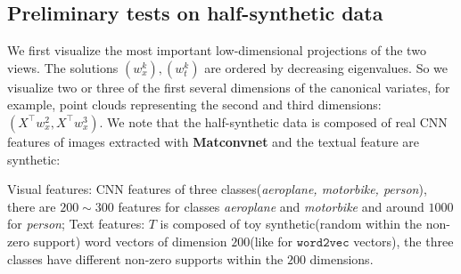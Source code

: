 \documentclass[12pt]{report}	%
\def\ts{\top}
\begin{document}
\subsection{Preliminary tests on half-synthetic data}
We first visualize the most important low-dimensional projections of the two views. The solutions $(w_x^k), (w_t^k)$ are ordered by decreasing eigenvalues. So we visualize two or three of the first several dimensions of the canonical variates, for example, point clouds representing the second and third dimensions: $(X^{\ts}w_x^2, X^{\ts}w_x^3)$. 
We note that the half-synthetic data is composed of real CNN features of images extracted with \textbf{Matconvnet} and the textual feature are synthetic:

Visual features: CNN features of three classes(\textit{aeroplane, motorbike, person}), there are $200\sim 300$ features for classes \textit{aeroplane} and \textit{motorbike} and around $1000$ for \textit{person}; 
Text features: $T$ is composed of toy synthetic(random within the non-zero support) word vectors of dimension $200$(like for $\texttt{word2vec}$ vectors), the three classes have different non-zero supports within the $200$ dimensions.
\end{document}
